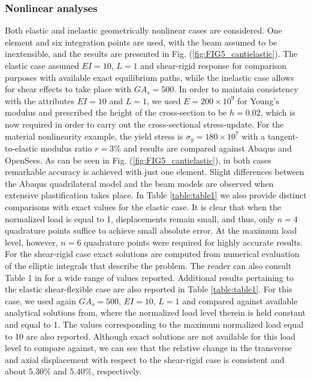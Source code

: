 \subsubsection{Nonlinear analyses}
Both elastic and inelastic geometrically nonlinear cases are
considered. One
element and six integration points are used, with the beam assumed to be
inextensible, and the results are presented in Fig. 
(\ref{fig:FIG5_cantielastic}). 
The elastic
case assumed $EI=10$, $L=1$ and shear-rigid response for comparison purposes 
with available exact equilibrium paths\cite{bisshopp}, while the inelastic
case allows for shear effects to take place with $GA_s=500$. In order to
maintain consistency with the attributes $EI=10$ and $L=1$, we used $E=200\times
10^9$ for Young's modulus and prescribed the height of the cross-section to be
$h=0.02$, which is now required in order to carry out the cross-sectional
stress-update.
For the material nonlinearity example, the yield stress is 
$\sigma_y=180\times10^7$ with a tangent-to-elastic modulus
ratio $r=3\%$ and results are compared against Abaqus and OpenSees. 
As can be seen in
Fig. (\ref{fig:FIG5_cantielastic}), in both cases remarkable accuracy is 
achieved
with just one element. Slight differences between the Abaqus quadrilateral 
model and
the beam models are observed when extensive plastification takes place. In 
Table \ref{table:table1} we also provide distinct comparisons with exact
values for the elastic case. It is clear
that when the normalized load is equal to 1, displacements remain small, and
thus, only $n=4$ quadrature points suffice to achieve small absolute error. At
the maximum load level, however, $n=6$ quadrature points 
were required for highly accurate results. 
For the shear-rigid case exact solutions are computed from numerical evaluation 
of the
elliptic integrals that describe the problem. The reader can also consult Table
1 in \cite{Mattiasson} for a wide range of values reported. Additional results
pertaining to the elastic shear-flexible case are also reported in Table
\ref{table:table1}. For this case, we used again $GA_s=500$, $EI=10$, $L=1$ and 
compared against available 
analytical solutions from\cite{Batista2}, where the normalized load
level therein is held constant and equal to 1. The values corresponding to the
maximum normalized load equal to 10 are also reported. Although exact solutions
are not available for this load level to compare against, we can see that the 
relative
change in the transverse and axial displacement with respect to the shear-rigid
case is consistent and about $5.30\%$ and $5.40\%$,
respectively.

